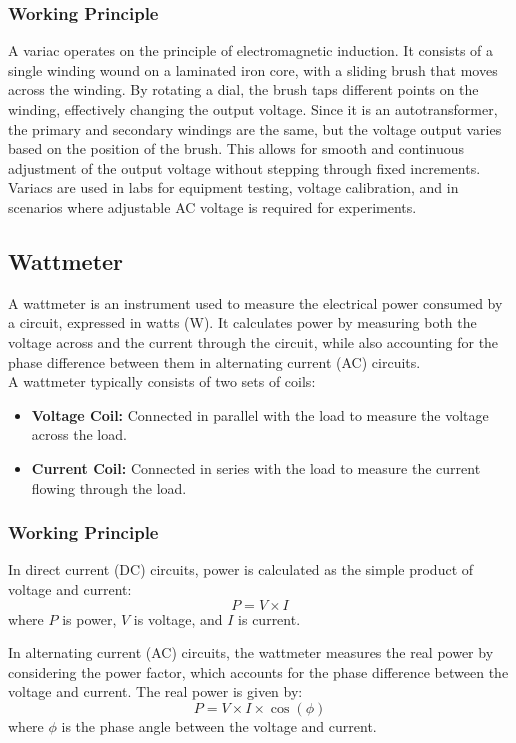 \documentclass[a4paper,12pt]{article}
\begin{document}
\subsubsection{Working Principle}
A variac operates on the principle of electromagnetic induction. It consists of a single winding wound on a laminated iron core, with a sliding brush that moves across the winding. By rotating a dial, the brush taps different points on the winding, effectively changing the output voltage. Since it is an autotransformer, the primary and secondary windings are the same, but the voltage output varies based on the position of the brush. This allows for smooth and continuous adjustment of the output voltage without stepping through fixed increments.\\
Variacs are used in labs for equipment testing, voltage calibration, and in scenarios where adjustable AC voltage is required for experiments.
	\newpage
\subsection{Wattmeter}
A wattmeter is an instrument used to measure the electrical power consumed by a circuit, expressed in watts (W). It calculates power by measuring both the voltage across and the current through the circuit, while also accounting for the phase difference between them in alternating current (AC) circuits.\\
A wattmeter typically consists of two sets of coils:
\begin{itemize}
	\item \textbf{Voltage Coil:} Connected in parallel with the load to measure the voltage across the load.
	\item \textbf{Current Coil:} Connected in series with the load to measure the current flowing through the load.
\end{itemize}

\subsubsection{Working Principle}
In direct current (DC) circuits, power is calculated as the simple product of voltage and current:
\[
P = V \times I
\]
where \( P \) is power, \( V \) is voltage, and \( I \) is current.

In alternating current (AC) circuits, the wattmeter measures the real power by considering the power factor, which accounts for the phase difference between the voltage and current. The real power is given by:
\[
P = V \times I \times \cos(\phi)
\]
where \( \phi \) is the phase angle between the voltage and current.
\end{document}
